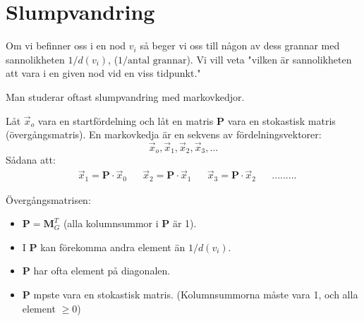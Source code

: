 \section{Slumpvandring} %
\label{sec:slumpvandring}
\begin{Def}
	Om vi befinner oss i en nod $v_i$ så beger vi oss till någon av dess grannar med sannolikheten $1/d(v_i)$, ($1/\mbox{antal grannar}$). Vi vill veta "vilken är sannolikheten att vara i en given nod vid en viss tidpunkt."
\end{Def}
Man studerar oftast slumpvandring med markovkedjor. 
\begin{Def}
	Låt $\vec{x}_o$ vara en startfördelning och låt en matris \textbf{P} vara en stokastisk matris (övergångsmatris). En markovkedja är en sekvens av fördelningsvektorer:
	\[
	\vec{x}_o, \vec{x}_1, \vec{x}_2, \vec{x}_3, ...
	\]
	Sådana att:
	\begin{align*}
	&\vec{x}_1 = \mathbf{P} \cdot \vec{x}_0
	&& \vec{x}_2 = \mathbf{P} \cdot \vec{x}_1
	&& \vec{x}_3 = \mathbf{P} \cdot \vec{x}_2
	&&.........
	\end{align*}
\end{Def}
\noindent
Övergångsmatrisen:
\begin{itemize}
	\item $\mathbf{P} = \mathbf{M}_G^T$ (alla kolumnsummor i \textbf{P} är 1). 
	\item I \textbf{P} kan förekomma andra element än $1/d(v_i)$.
	\item \textbf{P} har ofta element på diagonalen.
	\item \textbf{P} mpste vara en stokastisk matris. (Kolumnsummorna måste vara 1, och alla element $\ge 0$)
\end{itemize}
